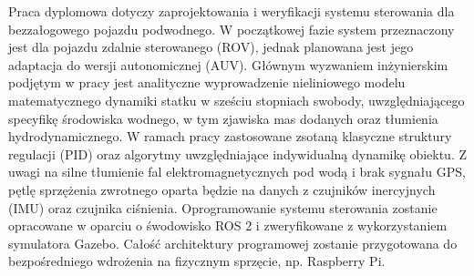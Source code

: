 Praca dyplomowa dotyczy zaprojektowania i weryfikacji systemu sterowania dla bezzałogowego pojazdu podwodnego. W początkowej fazie system przeznaczony jest dla pojazdu zdalnie sterowanego (ROV), jednak planowana jest jego adaptacja do wersji autonomicznej (AUV). Głównym wyzwaniem inżynierskim podjętym w pracy jest analityczne wyprowadzenie nieliniowego modelu matematycznego dynamiki statku w sześciu stopniach swobody, uwzględniającego specyfikę środowiska wodnego, w tym zjawiska mas dodanych oraz tłumienia hydrodynamicznego. W ramach pracy zastosowane zsotaną klasyczne struktury regulacji (PID) oraz algorytmy uwzględniające indywidualną dynamikę obiektu. Z uwagi na silne tłumienie fal elektromagnetycznych pod wodą i brak sygnału GPS, pętlę sprzężenia zwrotnego oparta będzie na danych z czujników inercyjnych (IMU) oraz czujnika ciśnienia. Oprogramowanie systemu sterowania zostanie opracowane w oparciu o śwodowisko ROS 2 i zweryfikowane z wykorzystaniem symulatora Gazebo. Całość architektury programowej zostanie przygotowana do bezpośredniego wdrożenia na fizycznym sprzęcie, np. Raspberry Pi.